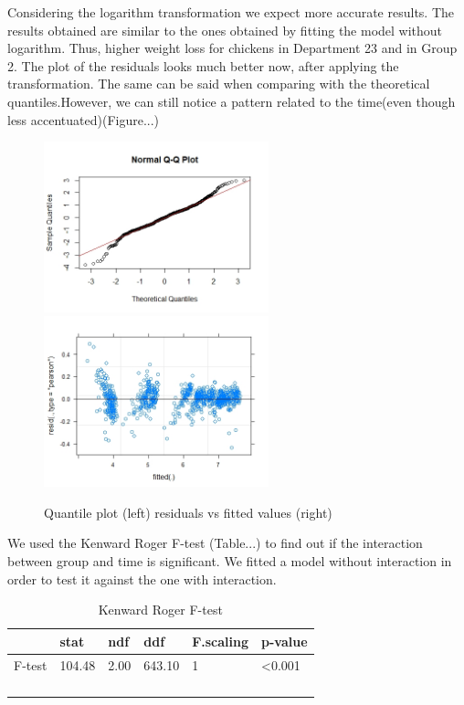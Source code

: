 \documentclass{article}
\begin{document}
Considering the logarithm transformation we expect more accurate results. The results obtained are similar to the ones obtained by fitting the model without logarithm. Thus, higher weight loss for chickens in Department 23 and in Group 2. 
The plot of the residuals looks much better now, after applying the transformation. The same can be said when comparing with the theoretical quantiles.However, we can still notice a pattern related to the time(even though less accentuated)(Figure...)


\begin{figure}[h!]%
    \centering
     {{\includegraphics[width=6.5cm]{qqplot_mod_poly.jpeg} }}%
    \qquad
     {{\includegraphics[width=6.5cm]{Resid_mod_poly_inter_l.jpeg} }}%
    \caption{Quantile plot (left) residuals vs fitted values (right)}%
    \label{fig:example}%
\end{figure}
 



We used the Kenward Roger F-test (Table...) to find out if the interaction between group and time is significant. We fitted a model without interaction in order to test it against the one with interaction.

\begin{table}
\begin{tabular}{llllll}
\caption{Kenward Roger F-test}
\hline
       & stat   & ndf  & ddf    & F.scaling & p-value          \\ \hline
F-test & 104.48 & 2.00 & 643.10 & 1         & \textless{}0.001 \\ \hline
       &        &      &        &           &                  \\
       &        &      &        &           &                  \\
       &        &      &        &           &                  \\
       &        &      &        &           &                 
\end{tabular}
\end{table}
\end{document}
